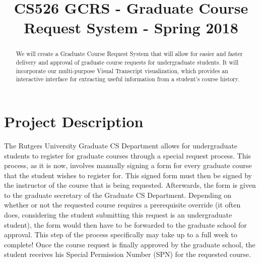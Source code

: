 \documentclass[10pt,conference]{IEEEtran}
\begin{document}
\title{CS526 GCRS - Graduate Course Request System - Spring 2018}
\author{
}

\maketitle
\begin{abstract}
\textnormal{
We will create a Graduate Course Request System that will allow for easier and faster delivery and approval of graduate course requests for undergraduate students. It will incorporate our multi-purpose Visual Transcript visualization, which provides an interactive interface for extracting useful information from a student's course history. 
}
\end{abstract}

\IEEEpeerreviewmaketitle
\section{Project Description}\label{sec:1. Project Description}
\textnormal{
The Rutgers University Graduate CS Department allows for undergraduate students to register for graduate courses through a special request process. This process, as it is now, involves manually signing a form for every graduate course that the student wishes to register for. This signed form must then be signed by the instructor of the course that is being requested. Afterwards, the form is given to the graduate secretary of the Graduate CS Department. Depending on whether or not the requested course requires a prerequisite override (it often does, considering the student submitting this request is an undergraduate student), the form would then have to be forwarded to the graduate school for approval. This step of the process specifically may take up to a full week to complete! Once the course request is finally approved by the graduate school, the student receives his Special Permission Number (SPN) for the requested course.
}
\end{document}
